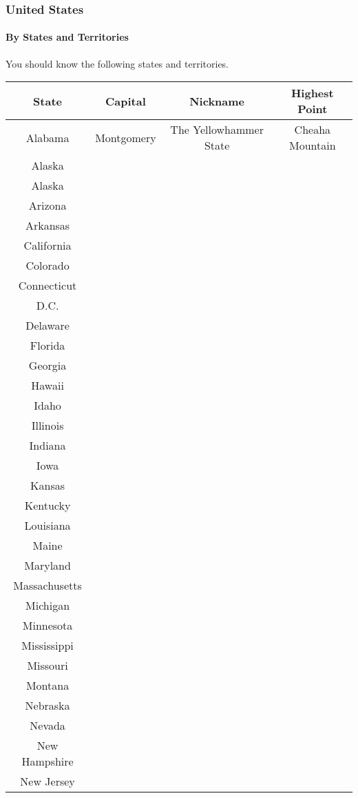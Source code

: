 		\subsubsection{United States}
			\paragraph{By States and Territories} You should know the following states and territories. 
			


			\begin{tabular}{|c|c|c|c|}
				\hline
				\textbf{State} & \textbf{Capital} & \textbf{Nickname} & \textbf{Highest Point} \\
				\hline
				Alabama & Montgomery & The Yellowhammer State & Cheaha Mountain  \\
				\hline
				 Alaska & & & \\
				 \hline
				 Alaska 	& & &  \\
				 \hline
				 Arizona 	& & &  \\
				 \hline
				 Arkansas 	& & &  \\
				 \hline
				 California 	& & &  \\
				 \hline
				 Colorado 	& & &  \\
				 \hline
				 Connecticut 	& & &  \\
				 \hline
				 D.C. 	& & &  \\
				 \hline
				 Delaware 	& & &  \\
				 \hline
				 Florida 	& & &  \\
				 \hline
				 Georgia 	& & &  \\
				 \hline
				 Hawaii 	& & &  \\
				 \hline
				 Idaho 	& & &  \\
				 \hline
				 Illinois 	& & &  \\
				 \hline
				 Indiana 	& & &  \\
				 \hline
				 Iowa 	& & &  \\
				 \hline
				 Kansas 	& & &  \\
				 \hline
				 Kentucky 	& & &  \\
				 \hline
				 Louisiana 	& & &  \\
				 \hline
				 Maine 	& & &  \\
				 \hline
				 Maryland 	& & &  \\
				 \hline
				 Massachusetts 	& & &  \\
				 \hline
				 Michigan 	& & &  \\
				 \hline
				 Minnesota 	& & &  \\
				 \hline
				 Mississippi 	& & &  \\
				 \hline
				 Missouri 	& & &  \\
				 \hline
				 Montana 	& & &  \\
				 \hline
				 Nebraska 	& & &  \\
				 \hline
				 Nevada 	& & &  \\
				 \hline
				 New Hampshire 	& & &  \\
				 \hline
				 New Jersey 	& & &  \\
				 \hline
			

\end{tabular}
